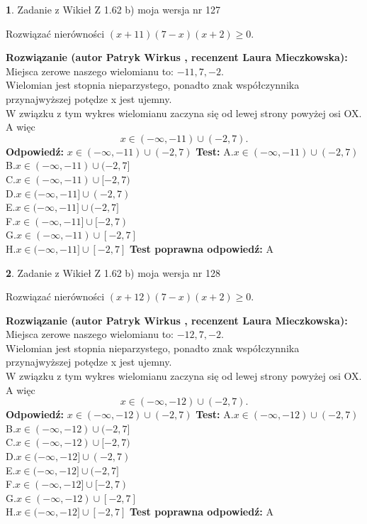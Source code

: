 \documentclass[12pt, a4paper]{article}
\theoremstyle{definition} %
\newtheorem{zad}{}
\newcommand{\zadStart}[1]{\begin{zad}#1\newline}
\newcommand{\zadStop}{\end{zad}}
\newcommand{\rozwStart}[2]{\noindent \textbf{Rozwiązanie (autor #1 , recenzent #2): }\newline}
\newcommand{\rozwStop}{\newline}
\newcommand{\odpStart}{\noindent \textbf{Odpowiedź:}\newline}
\newcommand{\odpStop}{\newline}
\newcommand{\testStart}{\noindent \textbf{Test:}\newline}
\newcommand{\testStop}{\newline}
\newcommand{\kluczStart}{\noindent \textbf{Test poprawna odpowiedź:}\newline}
\newcommand{\kluczStop}{\newline}
\begin{document}
\zadStart{Zadanie z Wikieł Z 1.62 b) moja wersja nr 127}

Rozwiązać nierówności $(x+11)(7-x)(x+2)\ge0$.
\zadStop
\rozwStart{Patryk Wirkus}{Laura Mieczkowska}
Miejsca zerowe naszego wielomianu to: $-11, 7, -2$.\\
Wielomian jest stopnia nieparzystego, ponadto znak współczynnika przy\linebreak najwyższej potędze x jest ujemny.\\ W związku z tym wykres wielomianu zaczyna się od lewej strony powyżej osi OX. A więc $$x \in (-\infty,-11) \cup (-2,7).$$
\rozwStop
\odpStart
$x \in (-\infty,-11) \cup (-2,7)$
\odpStop
\testStart
A.$x \in (-\infty,-11) \cup (-2,7)$\\
B.$x \in (-\infty,-11) \cup (-2,7]$\\
C.$x \in (-\infty,-11) \cup [-2,7)$\\
D.$x \in (-\infty,-11] \cup (-2,7)$\\
E.$x \in (-\infty,-11] \cup (-2,7]$\\
F.$x \in (-\infty,-11] \cup [-2,7)$\\
G.$x \in (-\infty,-11) \cup [-2,7]$\\
H.$x \in (-\infty,-11] \cup [-2,7]$
\testStop
\kluczStart
A
\kluczStop



\zadStart{Zadanie z Wikieł Z 1.62 b) moja wersja nr 128}

Rozwiązać nierówności $(x+12)(7-x)(x+2)\ge0$.
\zadStop
\rozwStart{Patryk Wirkus}{Laura Mieczkowska}
Miejsca zerowe naszego wielomianu to: $-12, 7, -2$.\\
Wielomian jest stopnia nieparzystego, ponadto znak współczynnika przy\linebreak najwyższej potędze x jest ujemny.\\ W związku z tym wykres wielomianu zaczyna się od lewej strony powyżej osi OX. A więc $$x \in (-\infty,-12) \cup (-2,7).$$
\rozwStop
\odpStart
$x \in (-\infty,-12) \cup (-2,7)$
\odpStop
\testStart
A.$x \in (-\infty,-12) \cup (-2,7)$\\
B.$x \in (-\infty,-12) \cup (-2,7]$\\
C.$x \in (-\infty,-12) \cup [-2,7)$\\
D.$x \in (-\infty,-12] \cup (-2,7)$\\
E.$x \in (-\infty,-12] \cup (-2,7]$\\
F.$x \in (-\infty,-12] \cup [-2,7)$\\
G.$x \in (-\infty,-12) \cup [-2,7]$\\
H.$x \in (-\infty,-12] \cup [-2,7]$
\testStop
\kluczStart
A
\kluczStop
\end{document}
